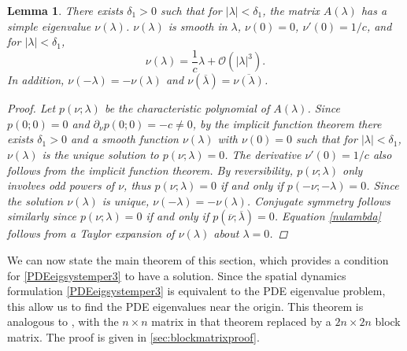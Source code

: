 \documentclass[12pt]{elsarticle}
\theoremstyle{plain}
\newtheorem{lemma}[theorem]{Lemma}
\theoremstyle{definition}
\theoremstyle{remark}
\numberwithin{theorem}{section}
\numberwithin{equation}{section}
\begin{document}
\begin{lemma}\label{nulambdalemma}
There exists $\delta_1 > 0$ such that for $|\lambda| < \delta_1$, the matrix $A(\lambda)$ has a simple eigenvalue $\nu(\lambda)$. $\nu(\lambda)$ is smooth in $\lambda$, $\nu(0) = 0$, $\nu'(0) = 1/c$, and for $|\lambda| < \delta_1$,
\begin{equation}\label{nulambda}
\nu(\lambda) = \frac{1}{c} \lambda + \mathcal{O}(|\lambda|^3).
\end{equation}
In addition, $\nu(-\lambda) = -\nu(\lambda)$ and $\nu(\overline{\lambda}) = \overline{\nu(\lambda)}$.
\begin{proof}
Let $p(\nu; \lambda)$ be the characteristic polynomial of $A(\lambda)$. Since $p(0; 0) = 0$ and $\partial_\nu p(0; 0) = -c \neq 0$, by the implicit function theorem there exists $\delta_1 > 0$ and a smooth function $\nu(\lambda)$ with $\nu(0) = 0$ such that for $|\lambda| < \delta_1$, $\nu(\lambda)$ is the unique solution to $p(\nu; \lambda) = 0$. The derivative $\nu'(0) = 1/c$ also follows from the implicit function theorem. By reversibility, $p(\nu; \lambda)$ only involves odd powers of $\nu$, thus $p(\nu; \lambda) = 0$ if and only if $p(-\nu; -\lambda) = 0$. Since the solution $\nu(\lambda)$ is unique, $\nu(-\lambda) = -\nu(\lambda)$. Conjugate symmetry follows similarly since $p(\nu; \lambda) = 0$ if and only if $p(\overline{\nu}; \overline{\lambda}) = 0$. Equation \cref{nulambda} follows from a Taylor expansion of $\nu(\lambda)$ about $\lambda = 0$. 
\end{proof}
\end{lemma}

We can now state the main theorem of this section, which provides a condition for \cref{PDEeigsystemper3} to have a solution. Since the spatial dynamics formulation \cref{PDEeigsystemper3} is equivalent to the PDE eigenvalue problem, this allow us to find the PDE eigenvalues near the origin. This theorem is analogous to \cite[Theorem 2]{Sandstede1998}, with the $n\times n$ matrix in that theorem replaced by a $2n\times 2n$ block matrix. The proof is given in \cref{sec:blockmatrixproof}.
\end{document}
